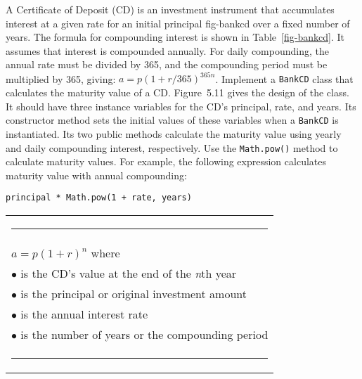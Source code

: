 \label{self-study-exercise}
\begin{SSTUDY}

\item A Certificate of Deposit (CD) is an investment instrument
that accumulates interest at a given rate for an initial principal
{fig-bankcd}
over a fixed number of years.  The formula for compounding interest is
shown in Table~\ref{fig-bankcd}. It assumes that interest is compounded
annually. For daily compounding, the annual rate must be divided by
365, and the compounding period must be multiplied by 365, giving: $a
= p(1 + r/365)^{365n}$.  Implement a {\tt BankCD} class that
calculates the maturity value of a CD. Figure~5.11 gives the design
of the class. It should have three instance variables for the CD's
principal, rate, and years. Its constructor method sets the initial
values of these variables when a {\tt BankCD} is instantiated. Its two
public methods calculate the maturity value using yearly and daily
compounding interest, respectively.  Use the {\tt Math.pow()} method
to calculate maturity values. For example, the following expression
calculates maturity value with annual compounding:

\begin{jjjlisting}
\begin{lstlisting}
principal * Math.pow(1 + rate, years)
\end{lstlisting}
\end{jjjlisting}

\begin{table}[htb]
\hspace*{3pc}\begin{tabular}{l}
\multicolumn{1}{l}{\color{cyan}\rule{20pc}{1pt}}\\[2pt]
           \multicolumn{1}{l}{$a = p(1 + r)^n$ where}\\[6pt]
$\bullet$\hspace*{5pt}{\it a} is the CD's value at the end of the {\it n}th year\\
$\bullet$\hspace*{5pt}{\it p} is the principal or original investment amount\\
$\bullet$\hspace*{5pt}{\it r} is the annual interest rate\\
$\bullet$\hspace*{5pt}{\it n} is the number of years or the compounding period
\\[-4pt]\multicolumn{1}{l}{\color{cyan}\rule{20pc}{1pt}}
\end{tabular}
\endTB
\end{table}


\end{SSTUDY}
